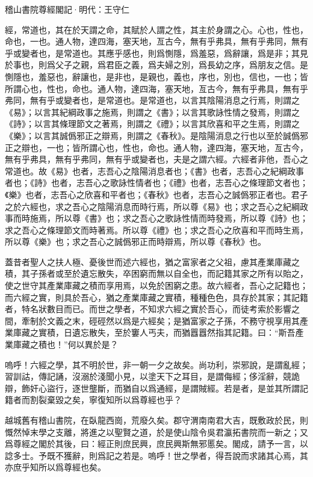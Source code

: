 \documentclass[12pt,a4paper]{ctexbook}
\begin{document}
稽山書院尊經閣記·明代：王守仁 \par
經，常道也，其在於天謂之命，其賦於人謂之性，其主於身謂之心。心也，性也，命也，一也。通人物，達四海，塞天地，亙古今，無有乎弗具，無有乎弗同，無有乎或變者也，是常道也。其應乎感也，則爲惻隱，爲羞惡，爲辭讓，爲是非；其見於事也，則爲父子之親，爲君臣之義，爲夫婦之別，爲長幼之序，爲朋友之信。是惻隱也，羞惡也，辭讓也，是非也，是親也，義也，序也，別也，信也，一也；皆所謂心也，性也，命也。通人物，達四海，塞天地，亙古今，無有乎弗具，無有乎弗同，無有乎或變者也，是常道也。是常道也，以言其陰陽消息之行焉，則謂之《易》；以言其紀綱政事之施焉，則謂之《書》；以言其歌詠性情之發焉，則謂之《詩》；以言其條理節文之著焉，則謂之《禮》；以言其欣喜和平之生焉，則謂之《樂》；以言其誠僞邪正之辯焉，則謂之《春秋》。是陰陽消息之行也以至於誠僞邪正之辯也，一也；皆所謂心也，性也，命也。通人物，達四海，塞天地，亙古今，無有乎弗具，無有乎弗同，無有乎或變者也，夫是之謂六經。六經者非他，吾心之常道也。故《易》也者，志吾心之陰陽消息者也；《書》也者，志吾心之紀綱政事者也；《詩》也者，志吾心之歌詠性情者也；《禮》也者，志吾心之條理節文者也；《樂》也者，志吾心之欣喜和平者也；《春秋》也者，志吾心之誠僞邪正者也。君子之於六經也，求之吾心之陰陽消息而時行焉，所以尊《易》也；求之吾心之紀綱政事而時施焉，所以尊《書》也；求之吾心之歌詠性情而時發焉，所以尊《詩》也；求之吾心之條理節文而時著焉。所以尊《禮》也；求之吾心之欣喜和平而時生焉，所以尊《樂》也；求之吾心之誠僞邪正而時辯焉，所以尊《春秋》也。\par
蓋昔者聖人之扶人極、憂後世而述六經也，猶之富家者之父祖，慮其產業庫藏之積，其子孫者或至於遺忘散失，卒困窮而無以自全也，而記籍其家之所有以貽之，使之世守其產業庫藏之積而享用焉，以免於困窮之患。故六經者，吾心之記籍也；而六經之實，則具於吾心，猶之產業庫藏之實積，種種色色，具存於其家；其記籍者，特名狀數目而已。而世之學者，不知求六經之實於吾心，而徒考索於影響之間，牽制於文義之末，硜硜然以爲是六經矣；是猶富家之子孫，不務守視享用其產業庫藏之實積，日遺忘散失，至於窶人丐夫，而猶囂囂然指其記籍。曰：“斯吾產業庫藏之積也！”何以異於是？\par
嗚呼！六經之學，其不明於世，非一朝一夕之故矣。尚功利，崇邪說，是謂亂經；習訓詁，傳記誦，沒溺於淺聞小見，以塗天下之耳目，是謂侮經；侈淫辭，競詭辯，飾奸心盜行，逐世壟斷，而猶自以爲通經，是謂賊經。若是者，是並其所謂記籍者而割裂棄毀之矣，寧復知所以爲尊經也乎？\par
越城舊有稽山書院，在臥龍西崗，荒廢久矣。郡守渭南南君大吉，既敷政於民，則慨然悼末學之支離，將進之以聖賢之道，於是使山陰令吳君瀛拓書院而一新之；又爲尊經之閣於其後，曰：經正則庶民興，庶民興斯無邪慝矣。閣成，請予一言，以諗多士。予既不獲辭，則爲記之若是。嗚呼！世之學者，得吾說而求諸其心焉，其亦庶乎知所以爲尊經也矣。\par
\end{document}
